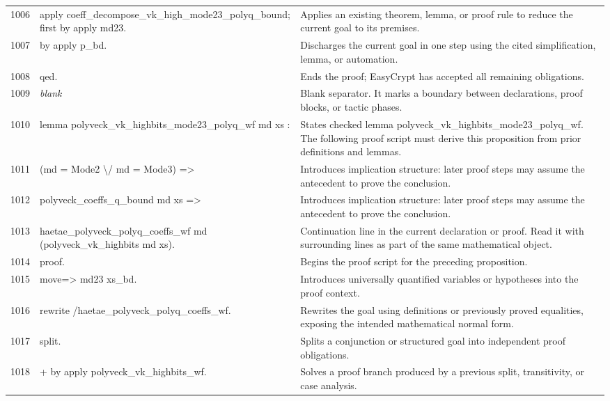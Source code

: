 \documentclass[10pt]{article}
\begin{document}
\begin{longtable}{r L{0.53\textwidth} L{0.37\textwidth}}
1006 & {\ttfamily\scriptsize apply coeff\_decompose\_vk\_high\_mode23\_polyq\_bound; first by apply md23.} & Applies an existing theorem, lemma, or proof rule to reduce the current goal to its premises. \\
1007 & {\ttfamily\scriptsize by apply p\_bd.} & Discharges the current goal in one step using the cited simplification, lemma, or automation. \\
1008 & {\ttfamily\scriptsize qed.} & Ends the proof; EasyCrypt has accepted all remaining obligations. \\
1009 & {\ttfamily\scriptsize \emph{blank}} & Blank separator.  It marks a boundary between declarations, proof blocks, or tactic phases. \\
1010 & {\ttfamily\scriptsize lemma polyveck\_vk\_highbits\_mode23\_polyq\_wf md xs :} & States checked lemma polyveck\_vk\_highbits\_mode23\_polyq\_wf.  The following proof script must derive this proposition from prior definitions and lemmas. \\
1011 & {\ttfamily\scriptsize   (md = Mode2 \textbackslash{}/ md = Mode3) =>} & Introduces implication structure: later proof steps may assume the antecedent to prove the conclusion. \\
1012 & {\ttfamily\scriptsize   polyveck\_coeffs\_q\_bound md xs =>} & Introduces implication structure: later proof steps may assume the antecedent to prove the conclusion. \\
1013 & {\ttfamily\scriptsize   haetae\_polyveck\_polyq\_coeffs\_wf md (polyveck\_vk\_highbits md xs).} & Continuation line in the current declaration or proof.  Read it with surrounding lines as part of the same mathematical object. \\
1014 & {\ttfamily\scriptsize proof.} & Begins the proof script for the preceding proposition. \\
1015 & {\ttfamily\scriptsize move=> md23 xs\_bd.} & Introduces universally quantified variables or hypotheses into the proof context. \\
1016 & {\ttfamily\scriptsize rewrite /haetae\_polyveck\_polyq\_coeffs\_wf.} & Rewrites the goal using definitions or previously proved equalities, exposing the intended mathematical normal form. \\
1017 & {\ttfamily\scriptsize split.} & Splits a conjunction or structured goal into independent proof obligations. \\
1018 & {\ttfamily\scriptsize + by apply polyveck\_vk\_highbits\_wf.} & Solves a proof branch produced by a previous split, transitivity, or case analysis. \\

\end{longtable}
\end{document}
